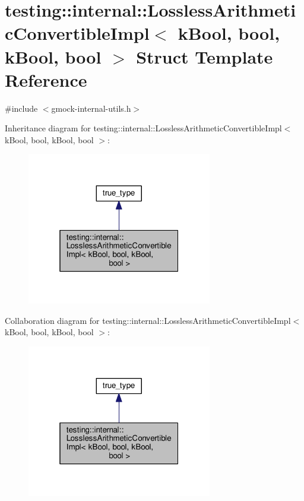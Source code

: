 \hypertarget{structtesting_1_1internal_1_1LosslessArithmeticConvertibleImpl_3_01kBool_00_01bool_00_01kBool_00_01bool_01_4}{}\section{testing\+:\+:internal\+:\+:Lossless\+Arithmetic\+Convertible\+Impl$<$ k\+Bool, bool, k\+Bool, bool $>$ Struct Template Reference}
\label{structtesting_1_1internal_1_1LosslessArithmeticConvertibleImpl_3_01kBool_00_01bool_00_01kBool_00_01bool_01_4}


{\ttfamily \#include $<$gmock-\/internal-\/utils.\+h$>$}



Inheritance diagram for testing\+:\+:internal\+:\+:Lossless\+Arithmetic\+Convertible\+Impl$<$ k\+Bool, bool, k\+Bool, bool $>$\+:\nopagebreak
\begin{figure}[H]
\begin{center}
\leavevmode
\includegraphics[width=229pt]{structtesting_1_1internal_1_1LosslessArithmeticConvertibleImpl_3_01kBool_00_01bool_00_01kBool_00_01bool_01_4__inherit__graph}
\end{center}
\end{figure}


Collaboration diagram for testing\+:\+:internal\+:\+:Lossless\+Arithmetic\+Convertible\+Impl$<$ k\+Bool, bool, k\+Bool, bool $>$\+:\nopagebreak
\begin{figure}[H]
\begin{center}
\leavevmode
\includegraphics[width=229pt]{structtesting_1_1internal_1_1LosslessArithmeticConvertibleImpl_3_01kBool_00_01bool_00_01kBool_00_01bool_01_4__coll__graph}
\end{center}
\end{figure}
